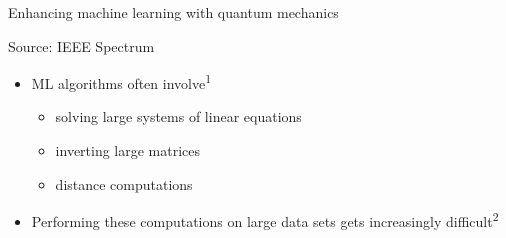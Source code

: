 \documentclass[10pt]{beamer}
\begin{document}
{\begin{frame}[fragile]{Enhancing machine learning with quantum mechanics}
\begin{minipage}[c]{0.49\textwidth}
\vspace{-0.2cm}
\tiny{Source: IEEE Spectrum}
\normalsize
\vspace{0.5cm}
\flushleft
\begin{itemize}	 
	\item ML algorithms often involve\textsuperscript{1}
	\begin{itemize}
	\item solving large systems of linear equations
	\item inverting large matrices
	\item distance computations
	\end{itemize}
	\item Performing these computations on large data
sets gets increasingly difficult\textsuperscript{2}
\end{itemize}
\end{minipage}


\end{frame}
}
\end{document}

